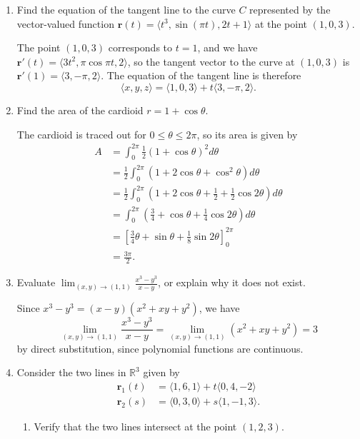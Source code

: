 \documentclass[12pt]{article}
\newcommand{\points}[1]{\marginpar{\hspace{24pt}[#1]}}
\newcommand{\di}{\displaystyle}
\newcommand{\R}{\mathbb{R}}
\renewcommand{\r}{\mathbf{r}}
\begin{document}
\begin{enumerate}
\item Find the equation of the tangent line to the curve $C$ represented by the vector-valued function $\mathbf{r}(t) = \langle t^3, \sin(\pi t), 2t+1\rangle$ at the point $(1,0,3)$.\points{4}

\bigskip

The point $(1,0,3)$ corresponds to $t=1$, and we have $\r'(t) = \langle 3t^2, \pi\cos \pi t, 2\rangle$, so the tangent vector to the curve at $(1,0,3)$ is $\r'(1) = \langle 3,-\pi,2\rangle$. The equation of the tangent line is therefore
\[
 \langle x,y,z\rangle = \langle 1,0,3\rangle +t\langle 3, -\pi,2\rangle.
\]

\bigskip

\bigskip

\item Find the area of the cardioid $r=1+\cos\theta$. \points{5}

\bigskip

The cardioid is traced out for $0\leq \theta\leq 2\pi$, so its area is given by
\begin{align*}
 A &= \int_0^{2\pi} \frac{1}{2}\left(1+\cos\theta\right)^2d\theta\\
& = \frac{1}{2}\int_0^{2\pi} \left(1+2\cos\theta+\cos^2\theta\right)d\theta\\
& = \frac{1}{2}\int_0^{2\pi}\left(1+2\cos\theta+\frac{1}{2}+\frac{1}{2}\cos 2\theta\right)d\theta\\
& = \int_0^{2\pi}\left(\frac{3}{4}+\cos\theta+\frac{1}{4}\cos 2\theta\right)d\theta\\
& = \left[\frac{3}{4}\theta+\sin\theta+\frac{1}{8}\sin 2\theta\right]_0^{2\pi}\\
& = \frac{3\pi}{2}.
\end{align*}

\bigskip

\item Evaluate $\di \lim_{(x,y)\to (1,1)}\frac{x^3-y^3}{x-y}$, or explain why it does not exist. \points{3}

\bigskip

Since $x^3-y^3 = (x-y)(x^2+xy+y^2)$, we have
\[
 \lim_{(x,y)\to (1,1)}\frac{x^3-y^3}{x-y} = \lim_{(x,y)\to (1,1)}(x^2+xy+y^2) = 3
\]
by direct substitution, since polynomial functions are continuous.

\newpage

\item Consider the two lines in $\R^3$ given by
\begin{align*}
\mathbf{r}_1(t) & = \langle 1,6,1\rangle + t\langle 0,4,-2\rangle\\
\mathbf{r}_2(s) & = \langle 0,3,0\rangle +s\langle 1,-1,3\rangle.
\end{align*}
\begin{enumerate}
\item Verify that the two lines intersect at the point $(1,2,3)$. \points{2}


\end{enumerate}
\end{enumerate}
\end{document}
